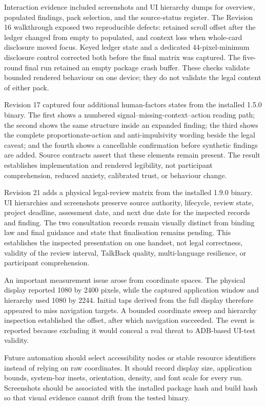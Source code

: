 Interaction evidence included screenshots and UI hierarchy dumps for overview, populated findings, pack selection, and the source-status register. The Revision 16 walkthrough exposed two reproducible defects: retained scroll offset after the ledger changed from empty to populated, and context loss when whole-card disclosure moved focus. Keyed ledger state and a dedicated 44-pixel-minimum disclosure control corrected both before the final matrix was captured. The five-round final run retained an empty package crash buffer. These checks validate bounded rendered behaviour on one device; they do not validate the legal content of either pack.

Revision 17 captured four additional human-factors states from the installed 1.5.0 binary. The first shows a numbered signal--missing-context--action reading path; the second shows the same structure inside an expanded finding; the third shows the complete proportionate-action and anti-impulsivity wording beside the legal caveat; and the fourth shows a cancellable confirmation before synthetic findings are added. Source contracts assert that these elements remain present. The result establishes implementation and rendered legibility, not participant comprehension, reduced anxiety, calibrated trust, or behaviour change.

Revision 21 adds a physical legal-review matrix from the installed 1.9.0 binary. UI hierarchies and screenshots preserve source authority, lifecycle, review state, project deadline, assessment date, and next due date for the inspected records and finding. The two consultation records remain visually distinct from binding law and final guidance and state that finalisation remains pending. This establishes the inspected presentation on one handset, not legal correctness, validity of the review interval, TalkBack quality, multi-language resilience, or participant comprehension.

An important measurement issue arose from coordinate spaces. The physical display reported 1080 by 2400 pixels, while the captured application window and hierarchy used 1080 by 2244. Initial taps derived from the full display therefore appeared to miss navigation targets. A bounded coordinate sweep and hierarchy inspection established the offset, after which navigation succeeded. The event is reported because excluding it would conceal a real threat to ADB-based UI-test validity.

Future automation should select accessibility nodes or stable resource identifiers instead of relying on raw coordinates. It should record display size, application bounds, system-bar insets, orientation, density, and font scale for every run. Screenshots should be associated with the installed package hash and build hash so that visual evidence cannot drift from the tested binary.

